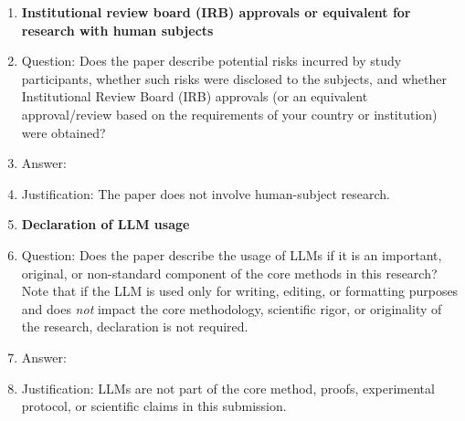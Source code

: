 \begin{enumerate}
\item {\bf Institutional review board (IRB) approvals or equivalent for research with human subjects}
    \item[] Question: Does the paper describe potential risks incurred by study participants, whether such risks were disclosed to the subjects, and whether Institutional Review Board (IRB) approvals (or an equivalent approval/review based on the requirements of your country or institution) were obtained?
    \item[] Answer: \answerNA{}
    \item[] Justification: The paper does not involve human-subject research.

\item {\bf Declaration of LLM usage}
    \item[] Question: Does the paper describe the usage of LLMs if it is an important, original, or non-standard component of the core methods in this research? Note that if the LLM is used only for writing, editing, or formatting purposes and does \emph{not} impact the core methodology, scientific rigor, or originality of the research, declaration is not required.
    \item[] Answer: \answerNA{}
    \item[] Justification: LLMs are not part of the core method, proofs, experimental protocol, or scientific claims in this submission.

\end{enumerate}
